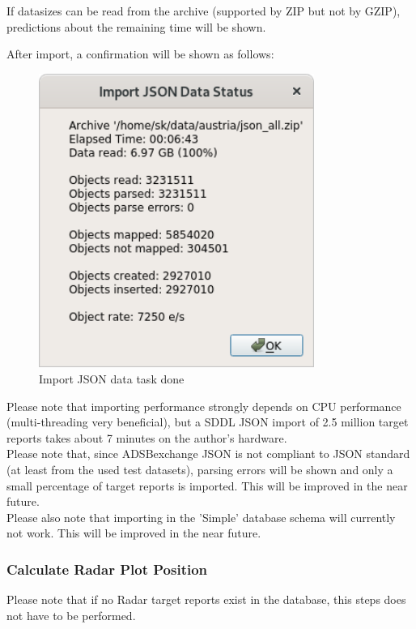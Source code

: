 {If datasizes can be read from the archive (supported by ZIP but not by GZIP), predictions about the remaining time will be shown.

After import, a confirmation will be shown as follows:

\begin{figure}[H]
  \center
    \includegraphics[width=9cm,frame]{../screenshots/json_import_done.png}
  \caption{Import JSON data task done}
\end{figure}

Please note that importing performance strongly depends on CPU performance (multi-threading very beneficial), but a SDDL JSON import of 2.5 million target reports takes about 7 minutes on the author's hardware. \\

Please note that, since ADSBexchange JSON is not compliant to JSON standard (at least from the used test datasets), parsing errors will be shown and only a small percentage of target reports is imported. This will be improved in the near future.\\

Please also note that importing in the 'Simple' database schema will currently not work.  This will be improved in the near future.

\subsubsection{Calculate Radar Plot Position}

Please note that if no Radar target reports exist in the database, this steps does not have to be performed.\\

}
